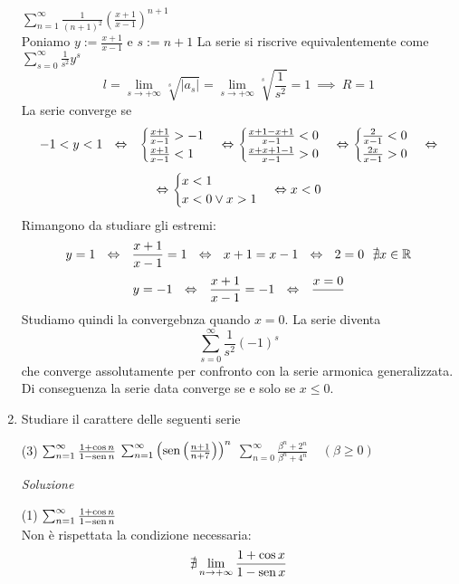 \documentclass{article}
\begin{document}
\begin{enumerate}[label=\textbf{Esercizio 9.\arabic*.},itemindent=*]
\begin{tasks}
        \task $\sum_{n=1}^\infty\frac{1}{(n+1)^2}\left( \frac{x+1}{x-1} \right)^{n+1}$\\
        Poniamo $y:=\frac{x+1}{x-1}$ e $s:=n+1$ La serie si riscrive equivalentemente come $\sum_{s=0}^\infty\frac{1}{s^2}y^{s}$
        \[l=\lim_{s\to+\infty}\sqrt[s]{|a_s|}=\lim_{s\to+\infty}\sqrt[s]{\frac{1}{s^2}}=1~\implies~R=1\]
        La serie converge se
        \[-1<y<1~~\Leftrightarrow~~\begin{cases}
            \frac{x+1}{x-1}>-1\\
            \frac{x+1}{x-1}<1
        \end{cases}\Leftrightarrow\begin{cases}
            \frac{x+1-x+1}{x-1}<0\\
            \frac{x+x+1-1}{x-1}>0
        \end{cases}\Leftrightarrow\begin{cases}
            \frac{2}{x-1}<0\\
            \frac{2x}{x-1}>0
        \end{cases}\Leftrightarrow\]\[\Leftrightarrow
        \begin{cases}
            x<1\\
            x<0\lor x>1
        \end{cases}\Leftrightarrow x<0\]
        Rimangono da studiare gli estremi:
        \[y=1~~\Leftrightarrow~~\frac{x+1}{x-1}=1~~\Leftrightarrow~~x+1=x-1~~\Leftrightarrow~~2=0~~\nexists x \in \mathbb{R}\]
        \[y=-1~~\Leftrightarrow~~\frac{x+1}{x-1}=-1~~\Leftrightarrow~~\frac{x=0}{}\]
        Studiamo quindi la convergebnza quando $x=0$. La serie diventa
        \[\sum_{s=0}^\infty\frac{1}{s^2}(-1)^{s}\]
        che converge assolutamente per confronto con la serie armonica generalizzata. Di conseguenza la serie data converge se e solo se $x\leq 0$.
    \end{tasks}
    \item Studiare il carattere delle seguenti serie
    \begin{tasks}(3)
        \task $\sum_{n=1}^\infty\frac{1+\cos n}{1-\operatorname{sen} n}$
        \task $\sum_{n=1}^\infty\left( \operatorname{sen}\left( \frac{n+1}{n+7} \right) \right)^n$
        \task $\sum_{n=0}^\infty\frac{\beta^n+2^n}{\beta^n+4^n}~~~~~(\beta\geq0)$
    \end{tasks}
    \item[\textit{\large Soluzione~}]~
    \begin{tasks}(1)
        \task $\sum_{n=1}^\infty\frac{1+\cos n}{1-\operatorname{sen} n}$\\
        Non è rispettata la condizione necessaria: 
        \[\nexists \lim_{n\to+\infty}\frac{1+\cos x}{1-\operatorname{sen} x}\]

\end{tasks}
\end{enumerate}
\end{document}
